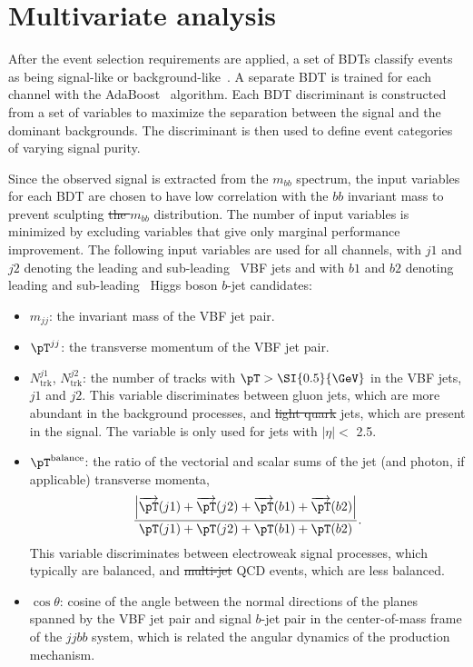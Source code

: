 \documentclass[PAPER, american,coverpage,texlive=2016, english]{\ATLASLATEXPATH atlasdoc}
\providecommand{\DIFadd}[1]{{\protect\color{blue}\uwave{#1}}} %
\providecommand{\DIFdel}[1]{{\protect\color{red}\sout{#1}}}                      %
\providecommand{\DIFaddbegin}{} %
\providecommand{\DIFaddend}{} %
\providecommand{\DIFdelbegin}{} %
\providecommand{\DIFdelend}{} %
\begin{document}
\section{Multivariate analysis}
\label{sec:mva}
After the event selection requirements are applied, a set of BDTs classify events as being signal-like or background-like~\cite{scikit-learn,tmva}. 
A separate BDT is trained for each channel with the AdaBoost~\cite{FREUND1997119} algorithm.
Each BDT discriminant is constructed from a set of variables to maximize the separation between the signal and the dominant backgrounds. 
The discriminant is then used to define event categories of varying signal purity.

Since the observed signal is extracted from the $m_{bb}$ spectrum, the input variables for each BDT are chosen to have low correlation with the $bb$ invariant mass to prevent sculpting \DIFdelbegin \DIFdel{the $m_{bb}$ }\DIFdelend \DIFaddbegin \DIFadd{of the }\DIFaddend distribution.
The number of input variables is minimized by excluding variables that give only marginal performance improvement.
The following input variables are used for all channels, with $j1$ and $j2$ denoting the leading and sub-leading \pT\ VBF jets and with $b1$ and $b2$ denoting leading and sub-leading \pT\ Higgs boson $b$-jet candidates:
\begin{itemize}
\item $m_{jj}$: the invariant mass of the VBF jet pair.
\item $\pT^{jj}$: the transverse momentum of the VBF jet pair.
\item $N_\text{trk}^{j1}$, $N_\text{trk}^{j2}$: the number of tracks with $\pT > \SI{0.5}{\GeV}$ in the VBF jets, $j1$ and $j2$.  This variable discriminates between gluon jets, which are more abundant in the background processes, and \DIFdelbegin \DIFdel{light quark }\DIFdelend \DIFaddbegin \DIFadd{light-quark }\DIFaddend jets, which are present in the signal. The variable is only used for jets with $|\eta| <$ 2.5.
\item $\pT^\text{balance}$: the ratio of the vectorial and scalar sums of the jet (and photon, if applicable) transverse momenta,
$$\frac{\left| \overrightarrow{\pT}(j1)+\overrightarrow{\pT}(j2)+\overrightarrow{\pT}(b1)+\overrightarrow{\pT}(b2) \right| }{ \pT (j1)+\pT(j2)+\pT(b1)+\pT(b2)  }.$$
This variable discriminates between electroweak signal processes, which typically are balanced, and \DIFdelbegin \DIFdel{multi-jet }\DIFdelend \DIFaddbegin \DIFadd{multijet }\DIFaddend QCD events, which are less balanced.
\item $\cos{\theta}$: cosine of the angle between the normal directions of the planes spanned by the VBF jet pair and signal $b$-jet pair in the center-of-mass frame of the $jjbb$ system, which is related \DIFaddbegin \DIFadd{to }\DIFaddend the angular dynamics of the production mechanism.
\end{itemize}
\end{document}
